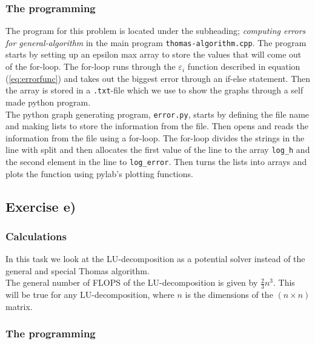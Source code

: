 \documentclass{article}
\begin{document}
  \subsubsection{The programming}

    The program for this problem is located under the subheading; \textit{computing errors for general-algorithm} in the main program \texttt{thomas-algorithm.cpp}. The program starts by setting up an epsilon max array to store the values that will come out of the for-loop. The for-loop runs through the $\varepsilon_i$ function described in equation (\ref{eq:errorfunc}) and takes out the biggest error through an if-else statement. Then the array is stored in a \texttt{.txt}-file which we use to show the graphs through a self made python program. \\

    The python graph generating program, \texttt{error.py}, starts by defining the file name and making lists to store the information from the file. Then opens and reads the information from the file using a for-loop. The for-loop divides the strings in the line with split and then allocates the first value of the line to the array \texttt{log\_h} and the second element in the line to \texttt{log\_error}. Then turns the lists into arrays and plots the function using pylab's plotting functions.


\subsection{Exercise e)} \label{sec:Method e)}


  \subsubsection{Calculations}

    In this task we look at the LU-decomposition as a potential solver instead of the general and special Thomas algorithm. \\

    The general number of FLOPS of the LU-decomposition is given by $ \frac{2}{3} n^3$. This will be true for any LU-decomposition, where $n$ is the dimensions of the $(n \times n)$ matrix.


  \subsubsection{The programming}
\end{document}
